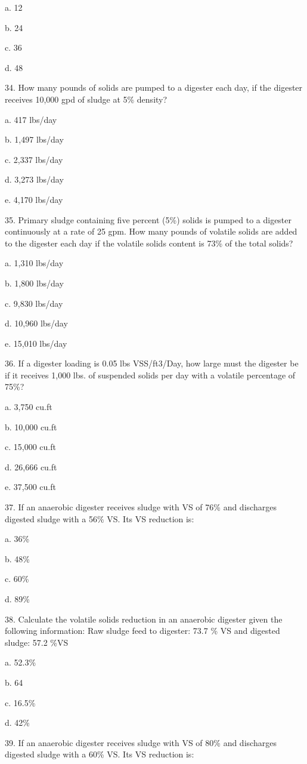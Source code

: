 \documentclass{article}
\begin{document}
a. 12 

b. 24 

c. 36 

d. 48 


34. How many pounds of solids are pumped to a digester each day, if the digester receives 10,000 gpd of sludge at 5\% density? 

a. 417 lbs/day 

b. 1,497 lbs/day 

c. 2,337 lbs/day 

d. 3,273 lbs/day 

e. 4,170 lbs/day 


35. Primary sludge containing five percent (5\%) solids is pumped to a digester continuously at a rate of 25 gpm. How many pounds of volatile solids are added to the digester each day if the volatile solids content is 73\% of the total solids? 

a. 1,310 lbs/day 

b. 1,800 lbs/day 

c. 9,830 lbs/day 

d. 10,960 lbs/day 

e. 15,010 lbs/day 


36. If a digester loading is 0.05 lbs VSS/ft3/Day, how large must the digester be if it receives 1,000 lbs. of suspended solids per day with a volatile percentage of 75\%? 

a. 3,750 cu.ft 

b. 10,000 cu.ft 

c. 15,000 cu.ft 

d. 26,666 cu.ft 

e. 37,500 cu.ft 


37. If an anaerobic digester receives sludge with VS of 76\% and discharges digested sludge with a 56\% VS. Its VS reduction is: 

a. 36\% 

b. 48\% 

c. 60\% 

d. 89\% 


38. Calculate the volatile solids reduction in an anaerobic digester given the following information: Raw sludge feed to digester: 73.7 \% VS and digested sludge: 57.2 \%VS 

a. 52.3\% 

b. 64 

c. 16.5\% 

d. 42\% 


39. If an anaerobic digester receives sludge with VS of 80\% and discharges digested sludge with a 60\% VS. Its VS reduction is: 
\end{document}
